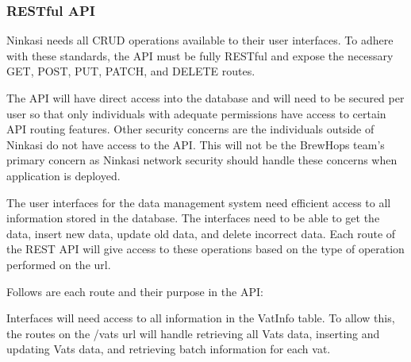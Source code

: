 \documentclass[draftclsnofoot,onecolumn,letterpaper,10pt]{IEEEtran}
\begin{document}
		\subsubsection{RESTful API}

			Ninkasi needs all CRUD operations available to their user interfaces.
			To adhere with these standards, the API must be fully RESTful and expose the necessary GET, POST, PUT, PATCH, and DELETE routes.

			The API will have direct access into the database and will need to be secured per user so that only individuals with adequate permissions have access to certain API routing features.
			Other security concerns are the individuals outside of Ninkasi do not have access to the API.
			This will not be the BrewHops team’s primary concern as Ninkasi network security should handle these concerns when application is deployed.

			The user interfaces for the data management system need efficient access to all information stored in the database.
			The interfaces need to be able to get the data, insert new data, update old data, and delete incorrect data.
			Each route of the REST API will give access to these operations based on the type of operation performed on the url.

			Follows are each route and their purpose in the API:

			Interfaces will need access to all information in the VatInfo table.
			To allow this, the routes on the /vats url will handle retrieving all Vats data, inserting and updating Vats data, and retrieving batch information for each vat.
\end{document}
